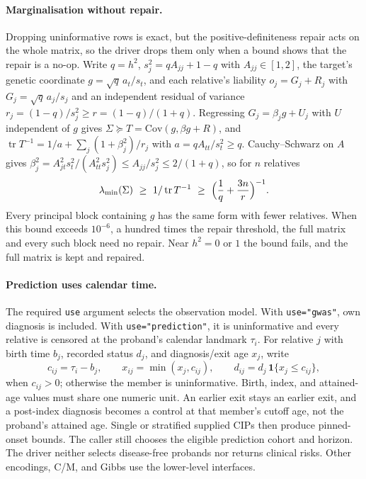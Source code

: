 \documentclass[11pt,a4paper]{article}
\begin{document}
\paragraph{Marginalisation without repair.}
Dropping uninformative rows is exact, but the positive-definiteness repair
acts on the whole matrix, so the driver drops them only when a bound shows
that the repair is a no-op. Write $q=h^2$, $s_j^2=qA_{jj}+1-q$ with
$A_{jj}\in[1,2]$, the target's genetic coordinate $g=\sqrt q\,a_t/s_t$, and
each relative's liability $o_j=G_j+R_j$ with $G_j=\sqrt q\,a_j/s_j$ and an
independent residual of variance $r_j=(1-q)/s_j^2\ge r=(1-q)/(1+q)$.
Regressing $G_j=\beta_jg+U_j$ with $U$ independent of $g$ gives
$\Sigma\succeq T=\mathrm{Cov}(g,\beta g+R)$, and
$\operatorname{tr}T^{-1}=1/a+\sum_j(1+\beta_j^2)/r_j$ with
$a=qA_{tt}/s_t^2\ge q$. Cauchy--Schwarz on $A$ gives
$\beta_j^2=A_{jt}^2s_t^2/(A_{tt}^2s_j^2)\le A_{jj}/s_j^2\le 2/(1+q)$, so for
$n$ relatives
\[
\lambda_{\min}(\Sigma)\ \ge\ 1/\operatorname{tr}T^{-1}\ \ge\
\Bigl(\frac1q+\frac{3n}{r}\Bigr)^{-1}.
\]
Every principal block containing $g$ has the same form with fewer
relatives. When this bound exceeds $10^{-6}$, a hundred times the repair
threshold, the full matrix and every such block need no repair. Near
$h^2=0$ or $1$ the bound fails, and the full matrix is kept and repaired.

\paragraph{Prediction uses calendar time.}
The required \texttt{use} argument selects the observation model.
With \texttt{use="gwas"}, own diagnosis is included.
With \texttt{use="prediction"}, it is uninformative and every relative
is censored at the proband's calendar landmark $\tau_i$.
For relative $j$ with birth time $b_j$, recorded status $d_j$, and
diagnosis/exit age $x_j$, write
\begin{equation}
  c_{ij}=\tau_i-b_j,\qquad
  x_{ij}=\min(x_j,c_{ij}),\qquad
  d_{ij}=d_j\,\mathbf{1}\{x_j\le c_{ij}\},
  \label{eq:calendar-censor}
\end{equation}
when $c_{ij}>0$; otherwise the member is uninformative.
Birth, index, and attained-age values must share one numeric unit.
An earlier exit stays an earlier exit, and a post-index diagnosis becomes
a control at that member's cutoff age, not the proband's attained age.
Single or stratified supplied CIPs then produce pinned-onset bounds.
The caller still chooses the eligible prediction cohort and horizon.
The driver neither selects disease-free probands nor returns clinical
risks. Other encodings, C/M, and Gibbs use the lower-level interfaces.
\end{document}
